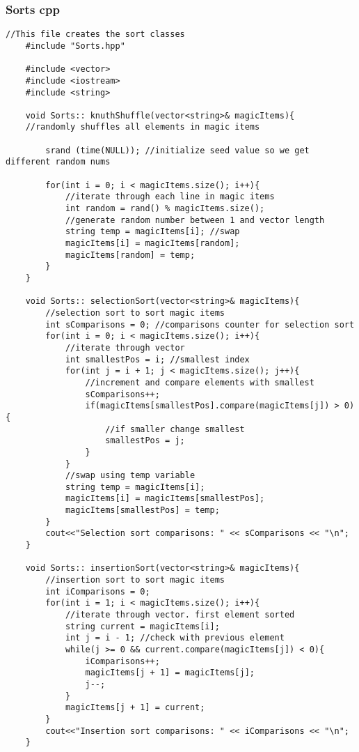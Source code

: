 \documentclass[letterpaper, 10pt,DIV=13]{scrartcl}
\numberwithin{equation}{section} %
\numberwithin{figure}{section} %
\numberwithin{table}{section} %
\begin{document}
\subsubsection*{Sorts cpp}
    \lstset{numbers=left, numberstyle=\tiny, stepnumber=1, numbersep=5pt, basicstyle=\footnotesize\ttfamily}
    \begin{lstlisting}[frame=single, ]
    //This file creates the sort classes
    #include "Sorts.hpp"
    
    #include <vector>
    #include <iostream>
    #include <string>
    
    void Sorts:: knuthShuffle(vector<string>& magicItems){ 
    //randomly shuffles all elements in magic items
    
        srand (time(NULL)); //initialize seed value so we get different random nums
    
        for(int i = 0; i < magicItems.size(); i++){ 
            //iterate through each line in magic items
            int random = rand() % magicItems.size(); 
            //generate random number between 1 and vector length
            string temp = magicItems[i]; //swap
            magicItems[i] = magicItems[random];
            magicItems[random] = temp;
        }
    }
    
    void Sorts:: selectionSort(vector<string>& magicItems){ 
        //selection sort to sort magic items
        int sComparisons = 0; //comparisons counter for selection sort
        for(int i = 0; i < magicItems.size(); i++){ 
            //iterate through vector
            int smallestPos = i; //smallest index
            for(int j = i + 1; j < magicItems.size(); j++){ 
                //increment and compare elements with smallest
                sComparisons++;
                if(magicItems[smallestPos].compare(magicItems[j]) > 0){
                    //if smaller change smallest
                    smallestPos = j;
                }
            }
            //swap using temp variable
            string temp = magicItems[i];
            magicItems[i] = magicItems[smallestPos];
            magicItems[smallestPos] = temp;
        }
        cout<<"Selection sort comparisons: " << sComparisons << "\n";
    }
    
    void Sorts:: insertionSort(vector<string>& magicItems){ 
        //insertion sort to sort magic items
        int iComparisons = 0;
        for(int i = 1; i < magicItems.size(); i++){ 
            //iterate through vector. first element sorted
            string current = magicItems[i];
            int j = i - 1; //check with previous element
            while(j >= 0 && current.compare(magicItems[j]) < 0){
                iComparisons++;
                magicItems[j + 1] = magicItems[j];
                j--;
            }
            magicItems[j + 1] = current;
        }
        cout<<"Insertion sort comparisons: " << iComparisons << "\n";
    }
    

\end{lstlisting}
\end{document}
